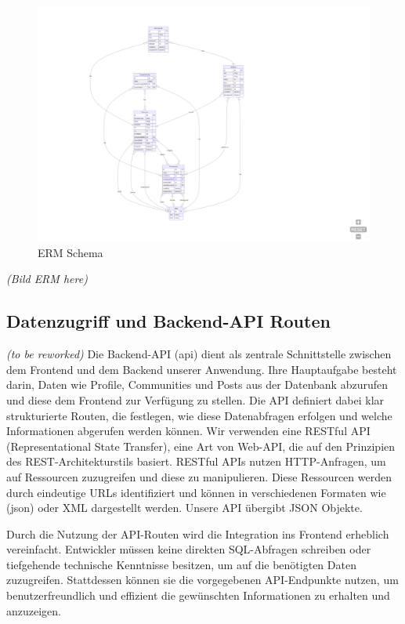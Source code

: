 \documentclass[a4paper,12pt]{article}
\begin{document}
\begin{figure}[p]
	\centering
	\includegraphics[scale=.5]{"ERM"}
	\caption{ERM Schema}
	\label{fig:ERM}
\end{figure}
\textit{(Bild ERM here)}

\newpage
\subsection{Datenzugriff und Backend-API Routen}
\textit{(to be reworked)} 
Die Backend-API (\gls{api}) dient als zentrale Schnittstelle zwischen dem Frontend und dem Backend unserer Anwendung. Ihre Hauptaufgabe besteht darin, Daten wie Profile, Communities und Posts aus der Datenbank abzurufen und diese dem Frontend zur Verfügung zu stellen. Die API definiert dabei klar strukturierte Routen, die festlegen, wie diese Datenabfragen erfolgen und welche Informationen abgerufen werden können. Wir verwenden eine RESTful API (Representational State Transfer), eine Art von Web-API, die auf den Prinzipien des REST-Architekturstils basiert. RESTful APIs nutzen HTTP-Anfragen, um auf Ressourcen zuzugreifen und diese zu manipulieren. Diese Ressourcen werden durch eindeutige URLs identifiziert und können in verschiedenen Formaten wie (\gls{json}) oder XML dargestellt werden. Unsere API übergibt JSON Objekte. 

Durch die Nutzung der API-Routen wird die Integration ins Frontend erheblich vereinfacht. Entwickler müssen keine direkten SQL-Abfragen schreiben oder tiefgehende technische Kenntnisse besitzen, um auf die benötigten Daten zuzugreifen. Stattdessen können sie die vorgegebenen API-Endpunkte nutzen, um benutzerfreundlich und effizient die gewünschten Informationen zu erhalten und anzuzeigen. 
\end{document}
